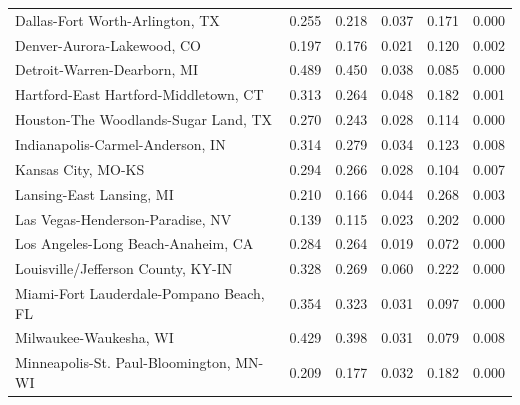 \documentclass[
  10pt,
]{article}
\begin{document}
\begin{table}
\begin{tabular}{lrrrrr}
Dallas-Fort Worth-Arlington, TX              &              0.255 &              0.218 &                 0.037 &           0.171 &       0.000 \\
Denver-Aurora-Lakewood, CO                   &              0.197 &              0.176 &                 0.021 &           0.120 &       0.002 \\
Detroit-Warren-Dearborn, MI                  &              0.489 &              0.450 &                 0.038 &           0.085 &       0.000 \\
Hartford-East Hartford-Middletown, CT        &              0.313 &              0.264 &                 0.048 &           0.182 &       0.001 \\
Houston-The Woodlands-Sugar Land, TX         &              0.270 &              0.243 &                 0.028 &           0.114 &       0.000 \\
Indianapolis-Carmel-Anderson, IN             &              0.314 &              0.279 &                 0.034 &           0.123 &       0.008 \\
Kansas City, MO-KS                           &              0.294 &              0.266 &                 0.028 &           0.104 &       0.007 \\
Lansing-East Lansing, MI                     &              0.210 &              0.166 &                 0.044 &           0.268 &       0.003 \\
Las Vegas-Henderson-Paradise, NV             &              0.139 &              0.115 &                 0.023 &           0.202 &       0.000 \\
Los Angeles-Long Beach-Anaheim, CA           &              0.284 &              0.264 &                 0.019 &           0.072 &       0.000 \\
Louisville/Jefferson County, KY-IN           &              0.328 &              0.269 &                 0.060 &           0.222 &       0.000 \\
Miami-Fort Lauderdale-Pompano Beach, FL      &              0.354 &              0.323 &                 0.031 &           0.097 &       0.000 \\
Milwaukee-Waukesha, WI                       &              0.429 &              0.398 &                 0.031 &           0.079 &       0.008 \\
Minneapolis-St. Paul-Bloomington, MN-WI      &              0.209 &              0.177 &                 0.032 &           0.182 &       0.000 \\

\end{tabular}
\end{table}
\end{document}
